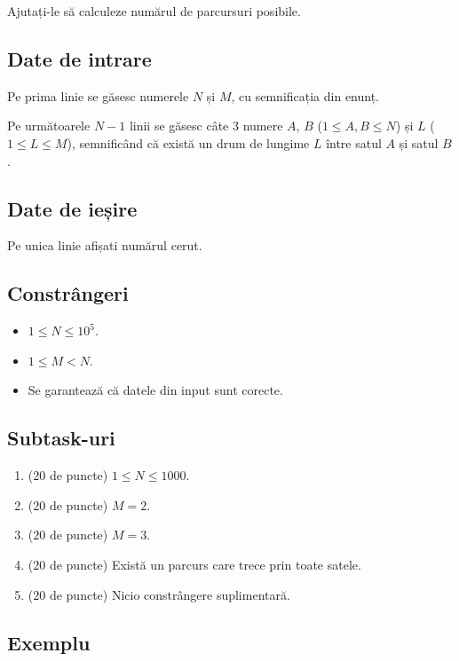 \documentclass[12pt,a4paper]{article}
\begin{document}
\vspace{1em}

Ajutați-le să calculeze numărul de parcursuri posibile.

\subsection*{Date de intrare}

Pe prima linie se găsesc numerele $N$ și $M$, cu semnificația din enunț.

Pe următoarele $N - 1$ linii se găsesc câte 3 numere $A$, $B$ ($1 \leq A, B \leq N$) și $L$ ($1 \leq L \leq M$), semnificând că există un drum de lungime $L$ între satul $A$ și satul $B$.

\subsection*{Date de ieșire}

Pe unica linie afișati numărul cerut. 

\subsection*{Constrângeri}

\begin{itemize}
    \item $1 \leq N \leq 10^5$.
    \item $1 \leq M < N$.
    \item Se garantează că datele din input sunt corecte.
\end{itemize}


\subsection*{Subtask-uri}

\begin{enumerate}
    \item ($20$ de puncte) $1 \leq N \leq 1000$.
    \item ($20$ de puncte) $M = 2$.
    \item ($20$ de puncte) $M = 3$.
    \item ($20$ de puncte) Există un parcurs care trece prin toate satele.
    \item ($20$ de puncte) Nicio constrângere suplimentară.
\end{enumerate}

\subsection*{Exemplu}
\end{document}
